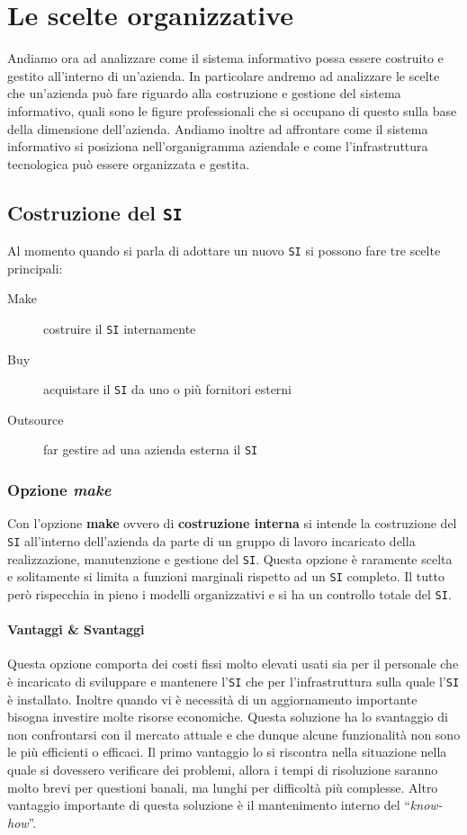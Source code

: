 \chapter{Le scelte organizzative}
\thispagestyle{chapterInit}
Andiamo ora ad analizzare come il sistema informativo possa essere costruito e gestito all'interno di un'azienda. In particolare andremo ad analizzare le scelte che un'azienda può fare riguardo alla costruzione e gestione del sistema informativo, quali sono le figure professionali che si occupano di questo sulla base della dimensione dell'azienda. Andiamo inoltre ad affrontare come il sistema informativo si posiziona nell'organigramma aziendale e come l'infrastruttura tecnologica può essere organizzata e gestita.
\section{Costruzione del \texttt{SI}}
    Al momento quando si parla di adottare un nuovo \texttt{SI} si possono fare tre scelte principali:
    \begin{description}
        \item[Make] costruire il \texttt{SI} internamente
        \item[Buy] acquistare il \texttt{SI} da uno o più fornitori esterni
        \item[Outsource] far gestire ad una azienda esterna il \texttt{SI}
    \end{description}
    \subsection{Opzione \textit{make}}
    \label{sec:opzMake}
        Con l'opzione \textbf{make} ovvero di \textbf{costruzione interna} si intende la costruzione del \texttt{SI} all'interno dell'azienda da parte di un gruppo di lavoro incaricato della realizzazione, manutenzione e gestione del \texttt{SI}.\newline
        Questa opzione è raramente scelta e solitamente si limita a funzioni marginali rispetto ad un \texttt{SI} completo. Il tutto però rispecchia in pieno i modelli organizzativi e si ha un controllo totale del \texttt{SI}.
        \subsubsection{Vantaggi \& Svantaggi} 
        Questa opzione comporta dei costi fissi molto elevati usati sia per il personale che è incaricato di sviluppare e mantenere l'\texttt{SI} che per l'infrastruttura sulla quale l'\texttt{SI} è installato. Inoltre quando vi è necessità di un aggiornamento importante bisogna investire molte risorse economiche. Questa soluzione ha lo svantaggio di non confrontarsi con il mercato attuale e che dunque alcune funzionalità non sono le più efficienti o efficaci. Il primo vantaggio lo si riscontra nella situazione nella quale si dovessero verificare dei problemi, allora i tempi di risoluzione saranno molto brevi per questioni banali, ma lunghi per difficoltà più complesse. Altro vantaggio importante di questa soluzione è il mantenimento interno del ``\textit{know-how}''.

